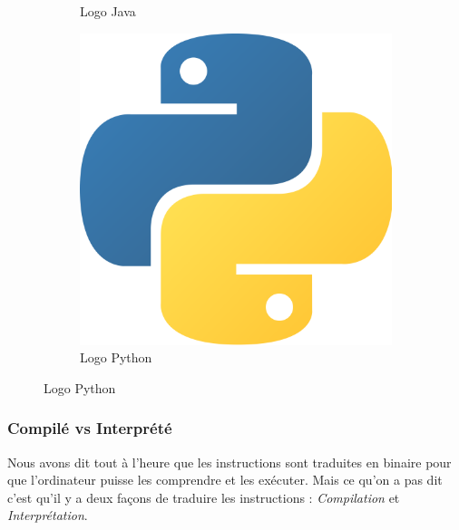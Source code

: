 \documentclass[12pt]{article}
\begin{document}
\begin{figure}[H]
\begin{subfigure}[b]{0.32\textwidth}
                \caption{Logo Java}
            \end{subfigure}
            \hfill
            \begin{subfigure}[b]{0.32\textwidth}
                \centering
                \includegraphics[width=\textwidth]{img/7_python.png}
                \caption{Logo Python}
            \end{subfigure}
        \end{figure}

        \subsubsection{Compilé vs Interprété}
            Nous avons dit tout à l'heure que les instructions sont traduites en binaire pour que l'ordinateur puisse
            les comprendre et les exécuter. Mais ce qu'on a pas dit c'est qu'il y a deux façons de traduire
            les instructions : \emph{Compilation} et \emph{Interprétation}.
\end{document}
